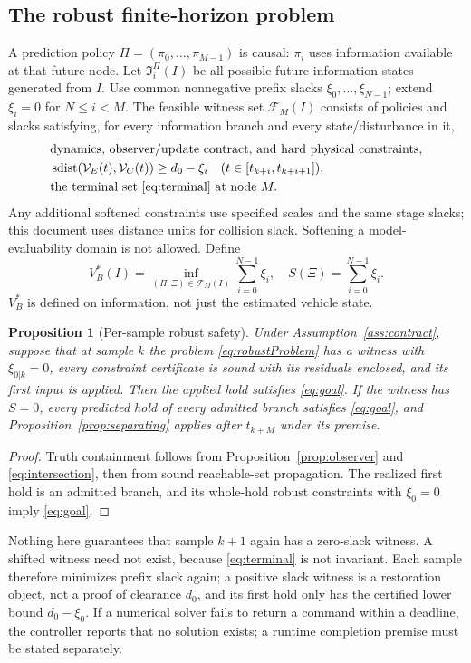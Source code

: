 \documentclass[10pt,letterpaper]{article}
\newtheorem{proposition}{Proposition}
\newcommand{\dist}{\operatorname{sdist}}
\begin{document}
\subsection{The robust finite-horizon problem}
A prediction policy $\Pi=(\pi_0,\ldots,\pi_{M-1})$ is causal: $\pi_i$ uses
information available at that future node. Let $\mathfrak I_i^\Pi(I)$ be all
possible future information states generated from $I$. Use common nonnegative
prefix slacks $\xi_0,\ldots,\xi_{N-1}$; extend $\xi_i=0$ for $N\le i<M$.
The feasible witness set $\mathcal F_M(I)$ consists of policies and slacks
satisfying, for every information branch and every state/disturbance in it,
\begin{align}\label{eq:robustProblem}
&\text{dynamics, observer/update contract, and hard physical constraints},\nonumber\\
&\dist(\mathcal V_E(t),\mathcal V_C(t))\ge d_0-\xi_i
\quad(t\in[t_{k+i},t_{k+i+1}]),\\
&\text{the terminal set \eqref{eq:terminal} at node }M.\nonumber
\end{align}
Any additional softened constraints use specified scales and the same stage
slacks; this document uses distance units for collision slack. Softening a
model-evaluability domain is not allowed.
Define
\begin{equation}\label{eq:pcbf}
V_B^*(I)=\inf_{(\Pi,\Xi)\in\mathcal F_M(I)}\sum_{i=0}^{N-1}\xi_i,
\quad S(\Xi)=\sum_{i=0}^{N-1}\xi_i.
\end{equation}
$V_B^*$ is defined on information, not just the estimated vehicle state.

\begin{proposition}[Per-sample robust safety]\label{prop:sampleSafety}
Under Assumption~\ref{ass:contract}, suppose that at sample $k$ the problem
\eqref{eq:robustProblem} has a witness with $\xi_{0|k}=0$, every constraint
certificate is sound with its residuals enclosed, and its first input is
applied. Then the applied hold satisfies \eqref{eq:goal}. If the witness has
$S=0$, every predicted hold of every admitted branch satisfies \eqref{eq:goal},
and Proposition~\ref{prop:separating} applies after $t_{k+M}$ under its premise.
\end{proposition}
\begin{proof}
Truth containment follows from Proposition~\ref{prop:observer} and
\eqref{eq:intersection}, then from sound reachable-set propagation. The
realized first hold is an admitted branch, and its whole-hold robust
constraints with $\xi_0=0$ imply \eqref{eq:goal}.
\end{proof}
Nothing here guarantees that sample $k+1$ again has a zero-slack witness. A
shifted witness need not exist, because \eqref{eq:terminal} is not invariant.
Each sample therefore minimizes prefix slack again; a positive slack witness is
a restoration object, not a proof of clearance $d_0$, and its first hold only
has the certified lower bound $d_0-\xi_0$. If a numerical solver fails to return
a command within a deadline, the controller reports that no solution exists; a
runtime completion premise must be stated separately.
\end{document}
